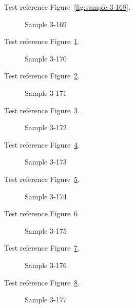 Test reference Figure~\ref{fig:sample-3-168}.

\begin{figure}[tbhp]
\caption{Sample 3-169}
\label{fig:sample-3-169}
\end{figure}

Test reference Figure~\ref{fig:sample-3-169}.

\begin{figure}[tbhp]
\caption{Sample 3-170}
\label{fig:sample-3-170}
\end{figure}

Test reference Figure~\ref{fig:sample-3-170}.

\begin{figure}[tbhp]
\caption{Sample 3-171}
\label{fig:sample-3-171}
\end{figure}

Test reference Figure~\ref{fig:sample-3-171}.

\begin{figure}[tbhp]
\caption{Sample 3-172}
\label{fig:sample-3-172}
\end{figure}

Test reference Figure~\ref{fig:sample-3-172}.

\begin{figure}[tbhp]
\caption{Sample 3-173}
\label{fig:sample-3-173}
\end{figure}

Test reference Figure~\ref{fig:sample-3-173}.

\begin{figure}[tbhp]
\caption{Sample 3-174}
\label{fig:sample-3-174}
\end{figure}

Test reference Figure~\ref{fig:sample-3-174}.

\begin{figure}[tbhp]
\caption{Sample 3-175}
\label{fig:sample-3-175}
\end{figure}

Test reference Figure~\ref{fig:sample-3-175}.

\begin{figure}[tbhp]
\caption{Sample 3-176}
\label{fig:sample-3-176}
\end{figure}

Test reference Figure~\ref{fig:sample-3-176}.

\begin{figure}[tbhp]
\caption{Sample 3-177}
\label{fig:sample-3-177}
\end{figure}

